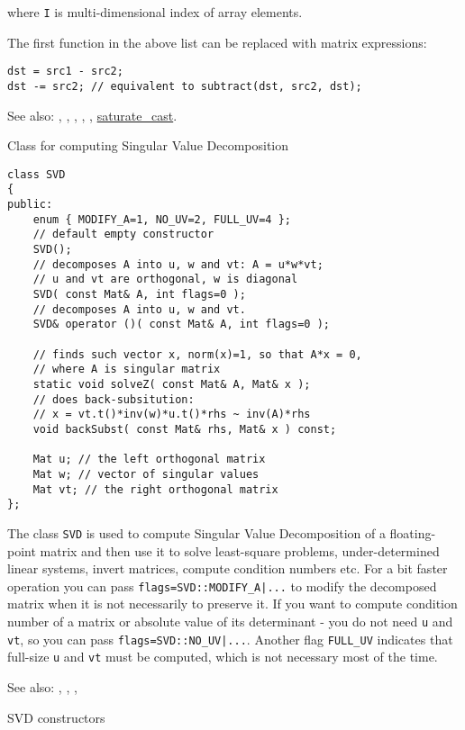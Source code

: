 where \texttt{I} is multi-dimensional index of array elements.

The first function in the above list can be replaced with matrix expressions:
\begin{lstlisting}
dst = src1 - src2;
dst -= src2; // equivalent to subtract(dst, src2, dst);
\end{lstlisting}

See also: , , , ,
, \hyperref[cppfunc.saturatecast]{saturate\_cast}.

Class for computing Singular Value Decomposition

\begin{lstlisting}
class SVD
{
public:
    enum { MODIFY_A=1, NO_UV=2, FULL_UV=4 };
    // default empty constructor
    SVD();
    // decomposes A into u, w and vt: A = u*w*vt;
    // u and vt are orthogonal, w is diagonal
    SVD( const Mat& A, int flags=0 );
    // decomposes A into u, w and vt.
    SVD& operator ()( const Mat& A, int flags=0 );

    // finds such vector x, norm(x)=1, so that A*x = 0,
    // where A is singular matrix
    static void solveZ( const Mat& A, Mat& x );
    // does back-subsitution:
    // x = vt.t()*inv(w)*u.t()*rhs ~ inv(A)*rhs
    void backSubst( const Mat& rhs, Mat& x ) const;

    Mat u; // the left orthogonal matrix
    Mat w; // vector of singular values
    Mat vt; // the right orthogonal matrix
};
\end{lstlisting}

The class \texttt{SVD} is used to compute Singular Value Decomposition of a floating-point matrix and then use it to solve least-square problems, under-determined linear systems, invert matrices, compute condition numbers etc.
For a bit faster operation you can pass \texttt{flags=SVD::MODIFY\_A|...} to modify the decomposed matrix when it is not necessarily to preserve it. If you want to compute condition number of a matrix or absolute value of its determinant - you do not need \texttt{u} and \texttt{vt}, so you can pass \texttt{flags=SVD::NO\_UV|...}. Another flag \texttt{FULL\_UV} indicates that full-size \texttt{u} and \texttt{vt} must be computed, which is not necessary most of the time.

See also: , , , 

SVD constructors

